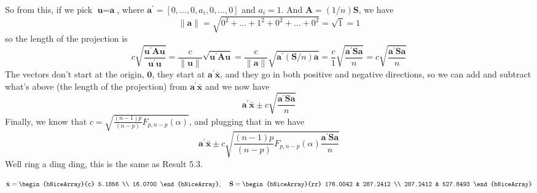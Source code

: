 \begin{enumerate}[label=(\alph*)]
    So from this, if we pick $\textbf{u} = \textbf{a}$, where $\textbf{a}^{\prime} = [0, \dots, 0, a_{i}, 0, \dots, 0]$ and $a_{i} = 1$. And $\textbf{A} = (1/n)\textbf{S}$, we have
    \[
        \|\textbf{a}\|
        =
        \sqrt{0^{2} + \dots + 1^{2} + 0^{2} + \dots + 0^{2}}
        =
        \sqrt{1}
        =
        1
    \]
    so the length of the projection is
    \[
        c
        \sqrt{
            \frac{
                \textbf{u}^{\prime}
                \textbf{A}
                \textbf{u}
            }{
                \textbf{u}^{\prime}\textbf{u}
            }
        }
        =
        \frac{c}{\|\textbf{u}\|}
        \sqrt{\textbf{u}^{\prime}\textbf{A}\textbf{u}}
        =
        \frac{c}{\|\textbf{a}\|}
        \sqrt{
            \textbf{a}^{\prime}
            \left(\textbf{S}/n\right)
            \textbf{a}
            }
        =
        \frac{c}{1}
        \sqrt{
            \frac{
                \textbf{a}^{\prime}
                \textbf{S}
                \textbf{a}
            }{n}
            }
        =
        c
        \sqrt{
            \frac{
                \textbf{a}^{\prime}
                \textbf{S}
                \textbf{a}
            }{n}
            }
    \]
    The vectors don't start at the origin, $\textbf{0}$, they start at $\textbf{a}^{\prime}\bar{\textbf{x}}$, and they go in both positive and negative directions, so we can add and subtract what's above (the length of the projection) from $\textbf{a}^{\prime}\bar{\textbf{x}}$ and we now have
    \[
        \textbf{a}^{\prime}\bar{\textbf{x}}
        \pm
        c
        \sqrt{
            \frac{
                \textbf{a}^{\prime}
                \textbf{S}
                \textbf{a}
            }{n}
            }
    \]
    Finally, we know that $c = \sqrt{\frac{(n-1)p}{(n-p)}F_{p, n-p}(\alpha)}$, and plugging that in we have
\[
        \textbf{a}^{\prime}\bar{\textbf{x}}
        \pm
        c
        \sqrt{
            \frac{(n-1)p}{(n-p)}F_{p, n-p}(\alpha)
            \frac{
                \textbf{a}^{\prime}
                \textbf{S}
                \textbf{a}
            }{n}
            }
    \]
    Well ring a ding ding, this is the same as Result 5.3.

    \[
        \bar{\textbf{x}}
        =
        \begin{bNiceArray}{c}
             5.1856 \\
            16.0700
        \end{bNiceArray},
        \hspace{0.4cm}
        \textbf{S}
        =
        \begin{bNiceArray}{rr}
            176.0042 & 287.2412 \\
            287.2412 & 527.8493
        \end{bNiceArray}
    \]


\end{enumerate}

